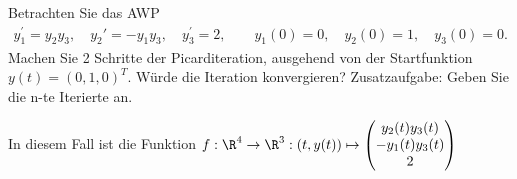 \begin{exercise}
    Betrachten Sie das AWP
    \begin{align*}
        y_1^\prime = y_2y_3, \quad y_2\prime = -y_1y_3, \quad y_3^\prime = 2, \qquad y_1(0) = 0, \quad y_2(0) = 1, \quad y_3(0) = 0.
    \end{align*}
    Machen Sie 2 Schritte der Picarditeration, ausgehend von der Startfunktion $y(t) = (0,1,0)^T$. Würde die Iteration konvergieren? Zusatzaufgabe: Geben Sie die n-te Iterierte an.
\end{exercise}

\begin{solution}

In diesem Fall ist die Funktion $f:\R^{4} \to \R^{3}:(t,y(t))\mapsto \begin{pmatrix}
     y_{2}(t)y_{3}(t)  \\
     -y_{1}(t)y_{3}(t) \\
     2
\end{pmatrix}$


\end{solution}
